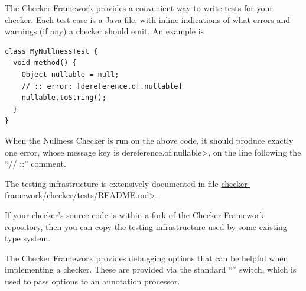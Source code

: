 
The Checker Framework provides a convenient way to write tests for your
checker.  Each test case is a Java file, with inline indications of what
errors and warnings (if any) a checker should emit.  An example is

\begin{Verbatim}
class MyNullnessTest {
  void method() {
    Object nullable = null;
    // :: error: [dereference.of.nullable]
    nullable.toString();
  }
}
\end{Verbatim}

\noindent
When the Nullness Checker is run on the above code, it should produce
exactly one error, whose message key is \<dereference.of.nullable>, on
the line following the ``// ::'' comment.

The testing infrastructure is extensively documented in file \href{https://github.com/typetools/checker-framework/blob/master/checker/tests/README.md}{\<checker-framework/checker/tests/README.md>}.

If your checker's source code is within a fork of the Checker Framework
repository, then you can copy the testing infrastructure used by some
existing type system.



The Checker Framework provides debugging options that can be helpful when
implementing a checker. These are provided via the standard  ``''
switch, which is used to pass options to an annotation processor.



